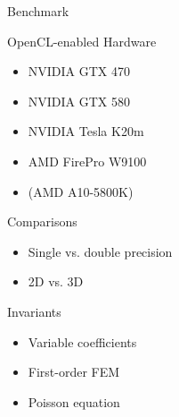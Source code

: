 

\begin{frame}{Benchmark}

 \begin{block}{OpenCL-enabled Hardware}
  \begin{itemize}
   \item NVIDIA GTX 470
   \item NVIDIA GTX 580
   \item NVIDIA Tesla K20m
   \item AMD FirePro W9100
   \item (AMD A10-5800K)
  \end{itemize}
 \end{block}

  \begin{block}{Comparisons}
  \begin{itemize}
   \item Single vs. double precision
   \item 2D vs. 3D
  \end{itemize}
 \end{block}

 \begin{block}{Invariants}
  \begin{itemize}
   \item Variable coefficients
   \item First-order FEM
   \item Poisson equation
  \end{itemize}
 \end{block}

\end{frame}



